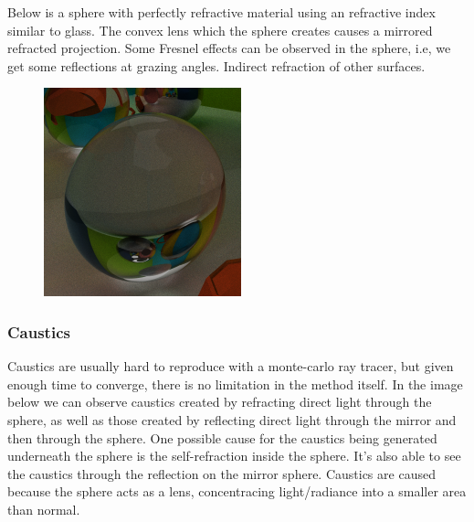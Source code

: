 \documentclass[a4paper, twocolumn]{article}
\begin{document}
            Below is a sphere with perfectly refractive material using an refractive index similar to glass. The convex lens which the sphere creates causes a mirrored refracted projection. Some Fresnel effects can be observed in the sphere, i.e, we get some reflections at grazing angles. Indirect refraction of other surfaces.
            \begin{figure}[H]
                \centering
                \includegraphics[width=0.8\linewidth]{share/new_render_refraction.png}
                \label{fig:render_refraction}
            \end{figure}

            \newpage

            \subsubsection*{Caustics}

            Caustics are usually hard to reproduce with a monte-carlo ray tracer, but given enough time to converge, there is no limitation in the method itself. In the image below we can observe caustics created by refracting direct light through the sphere, as well as those created by reflecting direct light through the mirror and then through the sphere. One possible cause for the caustics being generated underneath the sphere is the self-refraction inside the sphere. It's also able to see the caustics through the reflection on the mirror sphere. Caustics are caused because the sphere acts as a lens, concentracing light/radiance into a smaller area than normal.
\end{document}
